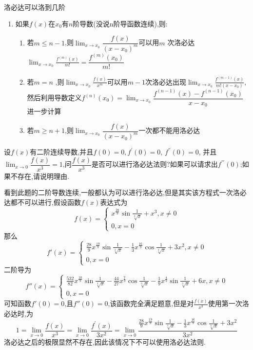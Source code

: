 \documentclass[10pt, a4paper, oneside, UTF8]{ctexbook}
\begin{document}
\begin{sloppypar}
\begin{criterion}{洛必达可以洛到几阶}{}
\begin{itemize}
\begin{enumerate}
\begin{enumerate}
                        \item 若$m>n$,则$\lim_{x\to x_0}\dfrac{f(x)}{\left(x-x_0\right)^m}$则一次都不能用洛必达.
                    \end{enumerate} 
                    \item 如果$f(x)$在$x_0$有$n$阶导数(没说n阶导函数连续),则:
                    \begin{enumerate}
                        \item 若$m{\leqslant}{n-1}$,则$\lim_{x\to x_0}\dfrac{f(x)}{\left(x-x_0\right)^m}$可以用$m$ 次洛必达$\lim_{x\to x_0}\frac{f^{(m)}\left(x\right)}{m!}=\dfrac{f^{(m)}\left(x_0\right)}{m!}$
                        \item 若$m=n$ ,则$\lim_{x\to x_0}\frac{f(x)}{x^m}$可以用$m-1$次洛必达出现$\lim_{x\to x_0}\frac{f^{(m-1)}\left(x\right)}{m!\left(x-x_0\right)}$,然后利用导数定义$f^{(n)}(x_0)=\lim_{x\to x_0}\dfrac{f^{(n-1)}\left(x\right)-f^{(n-1)}\left(x_0\right)}{x-x_0}$进一步计算
                        \item 若$m\geq n+1$,则$\lim_{x\to x_0}\dfrac{f(x)}{\left(x-x_0\right)^m}$一次都不能用洛必达
                    \end{enumerate}
            \end{enumerate}
        \end{itemize}
    \end{criterion}
    \begin{problem}
        设$f(x)$有二阶连续导数,并且$f(0){=}0, f^{\prime}(0){=}0$, $f^{''}(0){=}0$, 并且$\lim_{x\to0}\dfrac{f(x)}{x^3}=1$,问$\dfrac{f(x)}{x^3}$是否可以进行洛必达法则?如果可以请求出$f^{'''}(0)$;如果不存在,请说明理由.
    \end{problem}
    \begin{solution}
        看到此题的二阶导数连续,一般都认为可以进行洛必达,但是其实该方程式一次洛必达都不可以进行,假设函数$f(x)$表达式为$$f\left(x\right)=\begin{cases}x^{\frac{28}{9}}\sin\frac{1}{\sqrt[3]{x}}+x^3,x\neq0\\0,x=0\end{cases}$$那么$$f'\left(x\right)=\begin{cases}\frac{28}{9}x^{\frac{19}{9}}\sin\frac{1}{\sqrt[3]{x}}-\frac{1}{3}x^{\frac{16}{9}}\cos\frac{1}{\sqrt[3]{x}}+{3x^{2}},x\neq0\\0,x=0\end{cases}$$二阶导为$$f''(x)=\begin{cases}\frac{532}{82}x^{\frac{10}{9}}\sin\frac{1}{\sqrt[3]{x}}-\frac{44}{27}x^{\frac{7}{9}}\cos\frac{1}{\sqrt[3]{x}}-\frac{1}{9}x^{\frac{4}{9}}\sin\frac{1}{\sqrt[3]{x}}+6x,x\neq0\\0,x=0\end{cases}$$可知函数$f'(0)=0$,且$f''(0)=0$,该函数完全满足题意,但是对$\frac{f(x)}{x^3}$使用第一次洛必达时,为$$1=\lim_{x\to0}\frac{f\left(x\right)}{x^{3}}=\lim_{x\to0}\frac{f^{\prime}\left(x\right)}{3x^{2}}=\lim_{x\to0}\frac{\frac{28}9x^{\frac{19}9}\sin\frac1{\sqrt[3]{x}}-\frac13x^{\frac{16}9}\cos\frac1{\sqrt[3]{x}}+3x^2}{3x^{2}}$$洛必达之后的极限显然不存在,因此该情况下不可以使用洛必达法则.

\end{solution}
\end{sloppypar}
\end{document}
